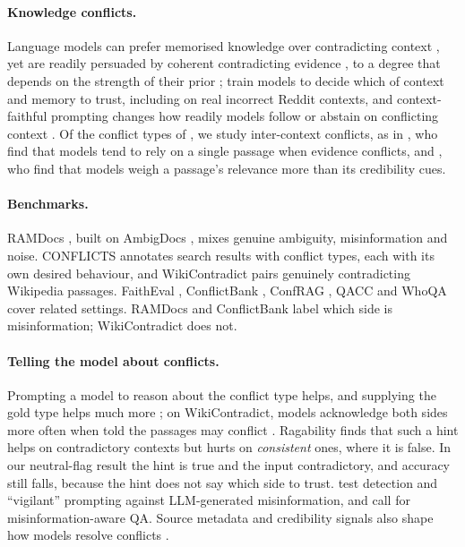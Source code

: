 \paragraph{Knowledge conflicts.}
Language models can prefer memorised knowledge over contradicting context \citep{longpre2021entity}, yet are readily
persuaded by coherent contradicting evidence \citep{xie2024chameleon}, to a degree that depends on the strength of
their prior \citep{wu2024clasheval}; \citet{huang2025trust} train models to decide which of context and memory to
trust, including on real incorrect Reddit contexts, and context-faithful prompting changes how readily models follow
or abstain on conflicting context \citep{zhou2023context}. Of the conflict types of \citet{xu2024survey}, we study inter-context
conflicts, as in \citet{chen2022rich}, who find that models tend to rely on a single passage when evidence conflicts,
and \citet{wan2024convincing}, who find that models weigh a passage's relevance more than its credibility cues.

\paragraph{Benchmarks.}
RAMDocs \citep{wang2025madam}, built on AmbigDocs \citep{lee2024ambigdocs}, mixes genuine ambiguity, misinformation
and noise. CONFLICTS \citep{cattan2025conflicts} annotates search results with conflict types, each with its own
desired behaviour, and WikiContradict \citep{hou2024wikicontradict} pairs genuinely contradicting Wikipedia passages.
FaithEval \citep{ming2025faitheval}, ConflictBank \citep{su2024conflictbank}, ConfRAG \citep{yuan2026confrag},
QACC \citep{liu2025qacc} and WhoQA \citep{pham2024whoqa} cover related settings. RAMDocs and ConflictBank label which side is misinformation; WikiContradict does not.

\paragraph{Telling the model about conflicts.}
Prompting a model to reason about the conflict type helps, and supplying the gold type helps much more
\citep{cattan2025conflicts}; on WikiContradict, models acknowledge both sides more often when told the passages may
conflict \citep{hou2024wikicontradict}. Ragability \citep{gross2026ragability} finds that such a hint helps on
contradictory contexts but hurts on \emph{consistent} ones, where it is false. In our neutral-flag result the hint is
true and the input contradictory, and accuracy still falls, because the hint does not say which side to trust.
\citet{pan2023risk} test detection and ``vigilant'' prompting against LLM-generated misinformation, and
\citet{pan2023attacking} call for misinformation-aware QA. Source metadata and credibility signals also shape how models resolve conflicts
\citep{chiang2024metadata,ge2025confact}.

